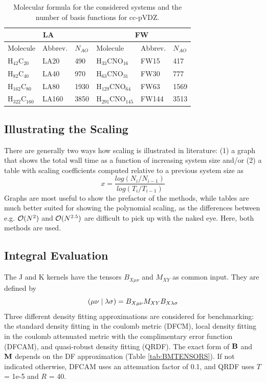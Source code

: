\begin{table}
\centering
\begin{tabular}{llllll}
\hline
\multicolumn{3}{c}{LA} & \multicolumn{3}{c}{FW} \\ \hline
Molecule & Abbrev. & $N_{AO}$ & Molecule & Abbrev. & $N_{AO}$ \\ \hline
H$_{42}$C$_{20}$ & LA20 & 490 & H$_{33}$CNO$_{16}$ & FW15 & 417 \\
H$_{82}$C$_{40}$ & LA40 & 970 & H$_{63}$CNO$_{31}$ & FW30 & 777 \\
H$_{162}$C$_{80}$ & LA80 & 1930 & H$_{129}$CNO$_{64}$ & FW63 & 1569  \\
H$_{322}$C$_{160}$ & LA160 & 3850 & H$_{291}$CNO$_{145}$ & FW144 & 3513 \\
\hline  
\end{tabular}
\caption{Molecular formula for the considered systems and the number of basis functions for cc-pVDZ. \label{tab:GS_NBAS}}
\end{table}

\subsection{Illustrating the Scaling}

There are generally two ways how scaling is illustrated in literature: (1) a graph that shows the total wall time as a function of increasing system size and/or (2) a table with scaling coefficients computed relative to a previous system size as
\begin{equation}
x = \frac{log(N_i/N_{i-1})}{log(T_i/T_{i-1})}
\end{equation} 
\noindent Graphs are most useful to show the prefactor of the methods, while tables are much better suited for showing the polynomial scaling, as the differences between e.g. $\mathcal{O}(N^{2})$ and $\mathcal{O}(N^{2.5})$ are difficult to pick up with the naked eye. Here, both methods are used. 

\FloatBarrier

\subsection{Integral Evaluation}

The J and K kernels have the tensors $B_{X\mu\nu}$ and $M_{XY}$ as common input. They are defined by
\begin{equation}
\left( \mu\nu \mid \lambda\sigma \right) = B_{X\mu\nu} M_{XY} B_{X\lambda\sigma}
\end{equation}
\noindent Three different density fitting approximations are considered for benchmarking: the standard density fitting in the coulomb metric (DFCM), local density fitting in the coulomb attenuated metric with the complimentary error function (DFCAM), and quasi-robust density fitting (QRDF). The exact form of $\mathbf{B}$ and $\mathbf{M}$ depends on the DF approximation (Table \ref{tab:BMTENSORS}). If not indicated otherwise, DFCAM uses an attenuation factor of 0.1, and QRDF uses $T$ = 1e-5 and $R$ = 40. 


